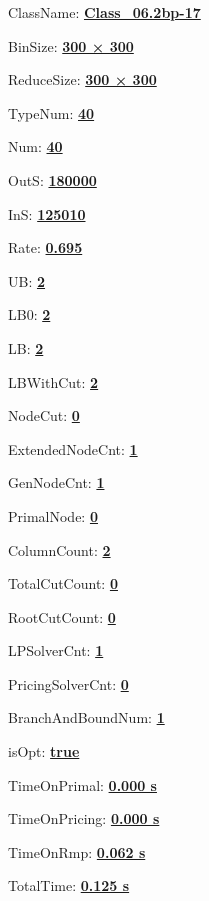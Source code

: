 \documentclass[11pt]{article}
\begin{document}
\pagestyle{empty}


ClassName: \underline{\textbf{Class_06.2bp-17}}
\par
BinSize: \underline{\textbf{300 × 300}}
\par
ReduceSize: \underline{\textbf{300 × 300}}
\par
TypeNum: \underline{\textbf{40}}
\par
Num: \underline{\textbf{40}}
\par
OutS: \underline{\textbf{180000}}
\par
InS: \underline{\textbf{125010}}
\par
Rate: \underline{\textbf{0.695}}
\par
UB: \underline{\textbf{2}}
\par
LB0: \underline{\textbf{2}}
\par
LB: \underline{\textbf{2}}
\par
LBWithCut: \underline{\textbf{2}}
\par
NodeCut: \underline{\textbf{0}}
\par
ExtendedNodeCnt: \underline{\textbf{1}}
\par
GenNodeCnt: \underline{\textbf{1}}
\par
PrimalNode: \underline{\textbf{0}}
\par
ColumnCount: \underline{\textbf{2}}
\par
TotalCutCount: \underline{\textbf{0}}
\par
RootCutCount: \underline{\textbf{0}}
\par
LPSolverCnt: \underline{\textbf{1}}
\par
PricingSolverCnt: \underline{\textbf{0}}
\par
BranchAndBoundNum: \underline{\textbf{1}}
\par
isOpt: \underline{\textbf{true}}
\par
TimeOnPrimal: \underline{\textbf{0.000 s}}
\par
TimeOnPricing: \underline{\textbf{0.000 s}}
\par
TimeOnRmp: \underline{\textbf{0.062 s}}
\par
TotalTime: \underline{\textbf{0.125 s}}
\par
\newpage
\end{document}
